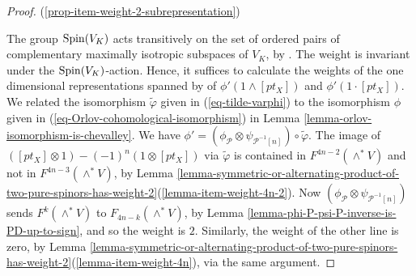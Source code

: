 \documentclass[12pt]{amsart}
\newcommand{\hide}[1]{}
\numberwithin{equation}{subsection}
\theoremstyle{plain}
\theoremstyle{definition}
\newcommand{\QQ}{{\mathbb Q}}
\renewcommand{\P}{{\mathcal P}}
\newcommand{\Spin}{{\rm Spin}}
\newcommand{\Sym}{{\rm Sym}}
\begin{document}
\begin{proof}
(\ref{prop-item-weight-2-subrepresentation}) 
\hide{
Let $\wedge^{2n}_+V_\QQ$ be the subspace of $\wedge^{2n}V_\QQ$ spanned by the top exterior powers of even maximan isotropic subspaces and let $\wedge^{2n}_-V_\QQ$ be the odd analogue.
We have the isomorphisms of $\Spin(V_\QQ)$ representations
\begin{eqnarray*}
S^+_\QQ\wedge S^+_\QQ&\cong&
\oplus_{h=0, \ h\equiv 2n+2 ({\rm mod}\ 4)}^{2n-1} \wedge^hV_\QQ
\\
\Sym^2(S^+_\QQ)
&\cong& \wedge^{2n}_+V_\QQ \oplus
\oplus_{h=0, \ h\equiv 2n ({\rm mod}\ 4)}^{2n-1} \wedge^hV_\QQ
\end{eqnarray*}
(see \cite[Sec. 3.4 page 96]{chevalley}). The weight of every irreducible $\Spin(V)_P$ subrepresentation of $S^+_\QQ\wedge S^+_\QQ$ is thus congruent to $2$ modulo $4$, if $n$ is even, by the first isomorphism above. The analogous statement for odd $n$ follows from the second isomorphism above.
}
The group $\Spin(V_K)$ acts transitively on the set of ordered pairs of 
complementary maximally isotropic subspaces of $V_K$, by \cite[Sec. 3.3, Lemma 1]{chevalley}.
The weight is invariant under the $\Spin(V_K)$-action. 
Hence, it suffices to calculate the weights of the one dimensional representations spanned by  
of $\phi'(1\wedge [pt_X])$ and $\phi'(1\cdot [pt_X])$. We related the isomorphism $\tilde{\varphi}$ given in (\ref{eq-tilde-varphi}) to the isomorphism $\phi$ 
given in (\ref{eq-Orlov-cohomological-isomorphism}) in Lemma \ref{lemma-orlov-isomorphism-is-chevalley}.
We have $\phi'=(\phi_\P\otimes\psi_{\P^{-1}[n]})\circ \tilde{\varphi}$. The image 
of $([pt_X]\otimes1)-(-1)^n (1\otimes[pt_X])$
via $\tilde{\varphi}$ is contained in $F^{4n-2}(\wedge^*V)$ and not in
$F^{4n-3}(\wedge^*V)$, by
Lemma \ref{lemma-symmetric-or-alternating-product-of-two-pure-spinors-has-weight-2}(\ref{lemma-item-weight-4n-2}). Now $(\phi_\P\otimes\psi_{\P^{-1}[n]})$
sends $F^k(\wedge^*V)$ to $F_{4n-k}(\wedge^*V)$, by Lemma \ref{lemma-phi-P-psi-P-inverse-is-PD-up-to-sign}, and so the weight is $2$.
Similarly, the weight of the other line is zero, by Lemma \ref{lemma-symmetric-or-alternating-product-of-two-pure-spinors-has-weight-2}(\ref{lemma-item-weight-4n}), via the same argument.
\end{proof}




% 
\end{document}
